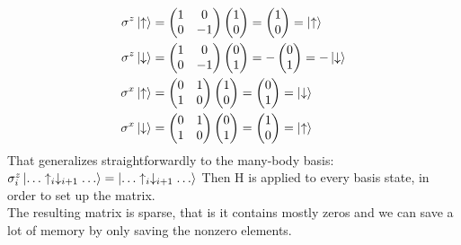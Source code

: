 \documentclass{article}
\begin{document}
\begin{align*}
\sigma^z \ket{\uparrow} &= 
\begin{pmatrix}
1 & 0\\
0 & -1
\end{pmatrix}
\begin{pmatrix}
1\\
0
\end{pmatrix} = 
\begin{pmatrix}
1\\
0
\end{pmatrix} = \ket{\uparrow}
\\
\sigma^z \ket{\downarrow} &= 
\begin{pmatrix}
1 & 0\\
0 & -1
\end{pmatrix}
\begin{pmatrix}
0\\
1
\end{pmatrix} = -
\begin{pmatrix}
0\\
1
\end{pmatrix} = -\ket{\downarrow}
\\
\sigma^x \ket{\uparrow} &= 
\begin{pmatrix}
0 & 1\\
1 & 0
\end{pmatrix}
\begin{pmatrix}
1\\
0
\end{pmatrix} = 
\begin{pmatrix}
0\\
1
\end{pmatrix} = \ket{\downarrow}
\\
\sigma^x \ket{\downarrow} &= 
\begin{pmatrix}
0 & 1\\
1 & 0
\end{pmatrix}
\begin{pmatrix}
0\\
1
\end{pmatrix} =
\begin{pmatrix}
1\\
0
\end{pmatrix} = \ket{\uparrow}
\end{align*}
That generalizes straightforwardly to the many-body basis: $\sigma_i^z \ket{\dotso \uparrow_i \downarrow_{i+1} \dotso} =\ket{\dotso \uparrow_i \downarrow_{i+1}\dotso} $ Then H is applied to every basis state, in order to set up the matrix.\\The resulting matrix is sparse, that is it contains mostly zeros and we can save a lot of memory by only saving the nonzero elements.\\
\end{document}
